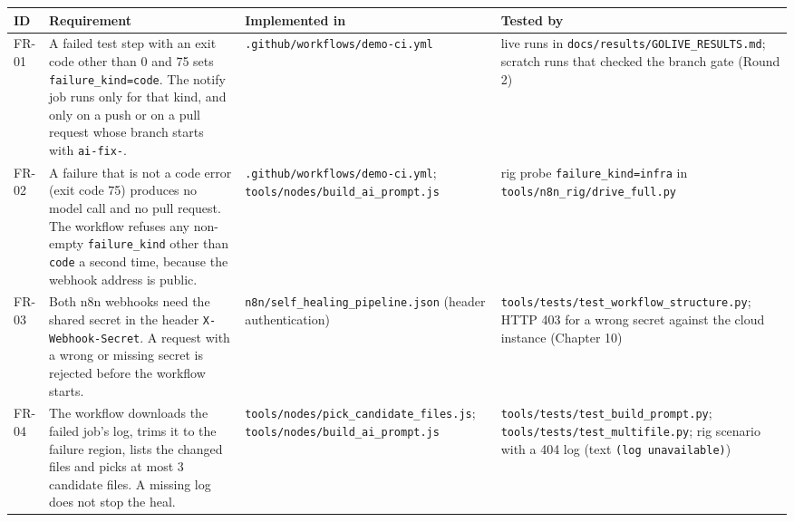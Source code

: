 \begin{table}[!htbp]
\centering
\small
\begin{tabularx}{\linewidth}{>{\raggedright\arraybackslash}p{1.2cm}>{\raggedright\arraybackslash}X>{\raggedright\arraybackslash}X>{\raggedright\arraybackslash}X}
\toprule
\textbf{ID} & \textbf{Requirement} & \textbf{Implemented in} & \textbf{Tested by} \\
\midrule
FR-01 & A failed test step with an exit code other than 0 and 75 sets \texttt{failure\_kind=code}. The notify job runs only for that kind, and only on a push or on a pull request whose branch starts with \texttt{ai-fix-}. & \texttt{.github/\allowbreak{}workflows/\allowbreak{}demo-ci.yml} & live runs in \texttt{docs/\allowbreak{}results/\allowbreak{}GOLIVE\_\allowbreak{}RESULTS.md}; scratch runs that checked the branch gate (Round 2) \\
FR-02 & A failure that is not a code error (exit code 75) produces no model call and no pull request. The workflow refuses any non-empty \texttt{failure\_kind} other than \texttt{code} a second time, because the webhook address is public. & \texttt{.github/\allowbreak{}workflows/\allowbreak{}demo-ci.yml}; \texttt{tools/\allowbreak{}nodes/\allowbreak{}build\_\allowbreak{}ai\_\allowbreak{}prompt.js} & rig probe \texttt{failure\_kind=infra} in \texttt{tools/\allowbreak{}n8n\_\allowbreak{}rig/\allowbreak{}drive\_\allowbreak{}full.py} \\
FR-03 & Both n8n webhooks need the shared secret in the header \texttt{X-Webhook-Secret}. A request with a wrong or missing secret is rejected before the workflow starts. & \texttt{n8n/\allowbreak{}self\_\allowbreak{}healing\_\allowbreak{}pipeline.json} (header authentication) & \texttt{tools/\allowbreak{}tests/\allowbreak{}test\_\allowbreak{}workflow\_\allowbreak{}structure.py}; HTTP 403 for a wrong secret against the cloud instance (Chapter 10) \\
FR-04 & The workflow downloads the failed job's log, trims it to the failure region, lists the changed files and picks at most 3 candidate files. A missing log does not stop the heal. & \texttt{tools/\allowbreak{}nodes/\allowbreak{}pick\_\allowbreak{}candidate\_\allowbreak{}files.js}; \texttt{tools/\allowbreak{}nodes/\allowbreak{}build\_\allowbreak{}ai\_\allowbreak{}prompt.js} & \texttt{tools/\allowbreak{}tests/\allowbreak{}test\_\allowbreak{}build\_\allowbreak{}prompt.py}; \texttt{tools/\allowbreak{}tests/\allowbreak{}test\_\allowbreak{}multifile.py}; rig scenario with a 404 log (text \texttt{(log unavailable)}) \\

\end{tabularx}
\end{table}
